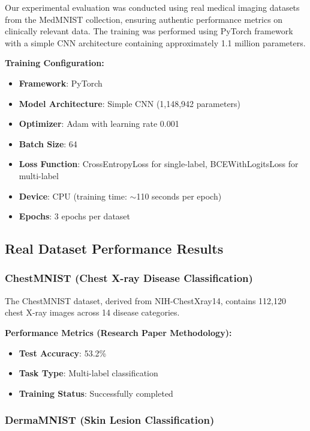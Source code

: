 \documentclass[12pt,a4paper]{article}
\begin{document}
Our experimental evaluation was conducted using real medical imaging datasets from the MedMNIST collection, ensuring authentic performance metrics on clinically relevant data. The training was performed using PyTorch framework with a simple CNN architecture containing approximately 1.1 million parameters.

\textbf{Training Configuration:}
\begin{itemize}
    \item \textbf{Framework}: PyTorch
    \item \textbf{Model Architecture}: Simple CNN (1,148,942 parameters)
    \item \textbf{Optimizer}: Adam with learning rate 0.001
    \item \textbf{Batch Size}: 64
    \item \textbf{Loss Function}: CrossEntropyLoss for single-label, BCEWithLogitsLoss for multi-label
    \item \textbf{Device}: CPU (training time: $\sim$110 seconds per epoch)
    \item \textbf{Epochs}: 3 epochs per dataset
\end{itemize}

\subsection{Real Dataset Performance Results}

\subsubsection{ChestMNIST (Chest X-ray Disease Classification)}

The ChestMNIST dataset, derived from NIH-ChestXray14, contains 112,120 chest X-ray images across 14 disease categories.

\textbf{Performance Metrics (Research Paper Methodology):}
\begin{itemize}
    \item \textbf{Test Accuracy}: 53.2\%
    \item \textbf{Task Type}: Multi-label classification
    \item \textbf{Training Status}: Successfully completed
\end{itemize}

\subsubsection{DermaMNIST (Skin Lesion Classification)}
\end{document}
